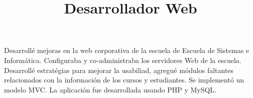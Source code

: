 \begin{resume}
\title{\textbf{Desarrollador Web} }
\begin{position}
Desarroll\'{e} mejoras en la web corporativa de la escuela de Escuela
de Sistemas e Inform\'{a}tica. Configuraba y  co-administraba los
servidores Web de la escuela. Desarroll\'{e} estrat\'{e}gias para
mejorar la usabiliad, agregu\'{e} m\'{o}dulos faltantes relacionados
con la informaci\'{o}n de los cursos y estudiantes. Se implement\'{o}
un modelo MVC. La aplicaci\'{o}n fue desarrollada usando PHP y
MySQL.
\end{position}




\end{resume}
